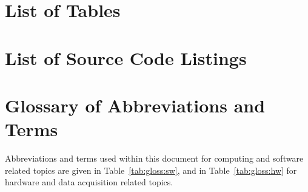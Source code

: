 \documentclass[11pt]{article}
\begin{document}
  \newpage
  \section{List of Tables}\label{app:list-tables}
    \listoftables

  \newpage
  \section{List of Source Code Listings}\label{app:list-listings}
    \lstlistoflistings

  \newpage
  \section{Glossary of Abbreviations and Terms}\label{app:glossary}

    Abbreviations and terms used within this document for computing and
    software related topics are given in Table~\ref{tab:gloss:sw}, and in
    Table~\ref{tab:gloss:hw} for hardware and data acquisition related topics.
\end{document}
